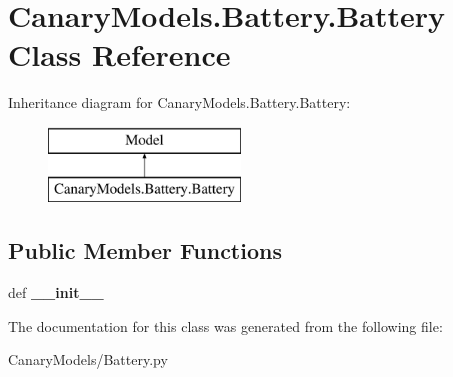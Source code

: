 \hypertarget{class_canary_models_1_1_battery_1_1_battery}{\section{Canary\-Models.\-Battery.\-Battery Class Reference}
\label{class_canary_models_1_1_battery_1_1_battery}
}
Inheritance diagram for Canary\-Models.\-Battery.\-Battery\-:\begin{figure}[H]
\begin{center}
\leavevmode
\includegraphics[height=2.000000cm]{class_canary_models_1_1_battery_1_1_battery}
\end{center}
\end{figure}
\subsection*{Public Member Functions}
\begin{DoxyCompactItemize}
\item 
\hypertarget{class_canary_models_1_1_battery_1_1_battery_afa69b07a7d6f918b91650f8f3297584b}{def {\bfseries \-\_\-\-\_\-init\-\_\-\-\_\-}}\label{class_canary_models_1_1_battery_1_1_battery_afa69b07a7d6f918b91650f8f3297584b}

\end{DoxyCompactItemize}


The documentation for this class was generated from the following file\-:\begin{DoxyCompactItemize}
\item 
Canary\-Models/Battery.\-py\end{DoxyCompactItemize}
